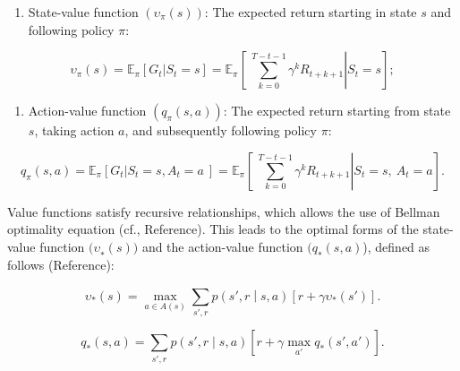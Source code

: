\begin{enumerate}
\def\labelenumi{\roman{enumi}.}
\item
  State-value function \((\upsilon_{\pi}(s))\): The expected return
  starting in state \(s\) and following policy \(\pi\):
\end{enumerate}

\begin{equation}
\upsilon_{\pi}(s) = \mathbb{E}_{\pi}\left\lbrack G_{t}|S_{t} = s \right\rbrack = \mathbb{E}_{\pi}\left\lbrack \left. \ \sum_{k = 0}^{T - t - 1}{\gamma^{k}R_{t + k + 1}} \right|S_{t} = s \right\rbrack;
\tag{3}
\end{equation}

\begin{enumerate}
\def\labelenumi{\roman{enumi}.}
\setcounter{enumi}{1}
\item
  Action-value function \((q_{\pi}(s,a))\): The expected return starting
  from state \(s\), taking action \(a\), and subsequently following
  policy \(\pi\):
\end{enumerate}

\begin{equation}
q_{\pi}(s,a) = \mathbb{E}_{\pi}\left\lbrack G_{t}|S_{t} = s,A_{t} = a\  \right\rbrack = \mathbb{E}_{\pi}\left\lbrack \left. \ \sum_{k = 0}^{T - t - 1}{\gamma^{k}R_{t + k + 1}} \right|S_{t} = s,\ A_{t} = a \right\rbrack.
\tag{4}
\end{equation}

Value functions satisfy recursive relationships, which allows the use of
Bellman optimality equation (\colorbox{yellow!40}{cf., Reference}). This leads to the
optimal forms of the state-value function \({(\upsilon}_{*}(s))\) and
the action-value function \({(q}_{*}(s,a)\)), defined as follows
(\colorbox{yellow!40}{Reference}):

\begin{equation}
\upsilon_{*}(s) = \max_{a \in A(s)}{\sum_{s',r}^{}{p\left( s',r \middle| s,a \right)\left\lbrack r + \gamma\upsilon_{*}(s') \right\rbrack}.}
\tag{5}
\end{equation}

\begin{equation}
q_{*}(s,a) = \sum_{s',r}^{}{p\left( s',r \middle| s,a \right)}\left\lbrack r + \gamma\max_{a'}{q_{*}(s',a')} \right\rbrack.
\tag{6}
\end{equation}


